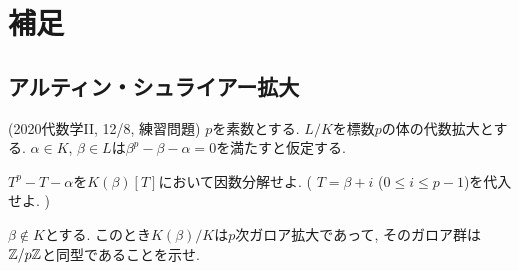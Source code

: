\section{補足}
\subsection{アルティン・シュライアー拡大}
\begin{egprob} (2020代数学II, 12/8, 練習問題)
$p$を素数とする. $L/K$を標数$p$の体の代数拡大とする. $\alpha\in K$, $\beta\in L$は$\beta^p - \beta - \alpha = 0$を満たすと仮定する.
\ben
\item $T^p - T - \alpha$を$K(\beta)[T]$において因数分解せよ. ( $T=\beta + i$ ($0\leq i\leq p-1$)を代入せよ. )
\item $\beta\notin K$とする. このとき$K(\beta)/K$は$p$次ガロア拡大であって, そのガロア群は$\mathbb{Z}/p\mathbb{Z}$と同型であることを示せ.
\een
\end{egprob}
